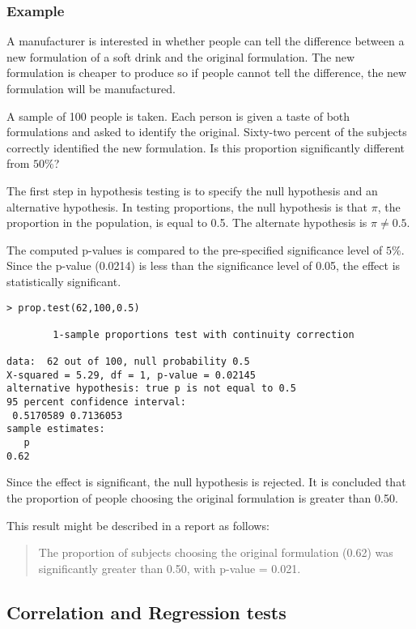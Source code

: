 \documentclass[a4paper,12pt]{article}
\begin{document}
\begin{itemize}
\begin{itemize}
\subsubsection{Example}
A manufacturer is interested in whether people can tell the difference between a new formulation of a soft drink and the original formulation. The new formulation is cheaper to produce so if people cannot tell the difference, the new formulation will be manufactured. 

A sample of 100 people is taken. Each person is given a taste of both formulations and asked to identify the original. Sixty-two percent of the subjects correctly identified the new formulation. Is this proportion significantly different from $50\%$? 
  
The first step in hypothesis testing is to specify the null hypothesis and an alternative hypothesis. In testing proportions, the null hypothesis is that $\pi$, the proportion in the population, is equal to 0.5. The alternate hypothesis is $\pi \neq 0.5$. 
  
The computed p-values is compared to the pre-specified significance level of $5\%$. Since the p-value (0.0214) is less than the significance level of 0.05, the effect is statistically significant. 

\begin{verbatim}
> prop.test(62,100,0.5)

        1-sample proportions test with continuity correction

data:  62 out of 100, null probability 0.5 
X-squared = 5.29, df = 1, p-value = 0.02145
alternative hypothesis: true p is not equal to 0.5 
95 percent confidence interval:
 0.5170589 0.7136053 
sample estimates:
   p 
0.62 
\end{verbatim}

Since the effect is significant, the null hypothesis is rejected. It is concluded that the proportion of people choosing the original formulation is greater than 0.50. 
  
This result might be described in a report as follows: 
  
    \begin{quote}
    The proportion of subjects choosing the original formulation (0.62) was significantly greater than 0.50, with p-value = 0.021.
    \end{quote}  


\subsection{Correlation  and Regression tests }

\end{itemize}
\end{itemize}
\end{document}
